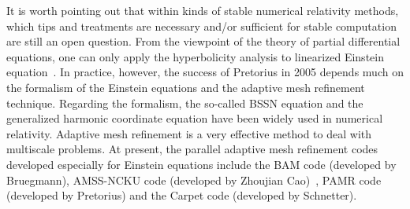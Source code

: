 \documentclass[a4paper,11pt]{article}
\begin{document}
It is worth pointing out that within kinds of stable numerical relativity methods, which tips and treatments are necessary and/or sufficient for stable computation are still an open question. From the  viewpoint of the theory of partial differential equations, one can only apply the hyperbolicity analysis to linearized Einstein equation~\cite{Hilditch:2013sba}. In practice, however, the success of Pretorius in 2005 depends much on the formalism of the Einstein equations and the adaptive mesh refinement technique. Regarding the formalism, the so-called BSSN equation and the generalized harmonic coordinate equation have been widely used in numerical relativity. Adaptive mesh refinement is a very effective method to deal with multiscale problems. At present, the parallel adaptive mesh refinement codes developed especially for Einstein equations include the BAM code (developed by Bruegmann), AMSS-NCKU code (developed by Zhoujian Cao)~\cite{AMSSNCKU}, PAMR code (developed by Pretorius) and the Carpet code (developed by Schnetter).
\end{document}
